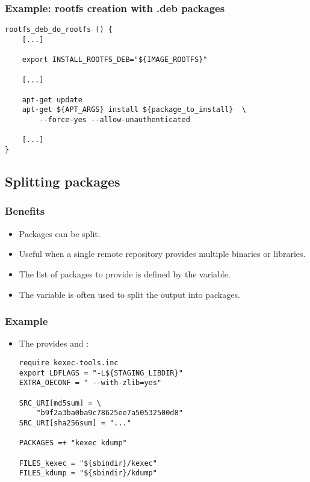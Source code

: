 \begin{frame}[fragile]
  \frametitle{Example: rootfs creation with .deb packages}
  \begin{block}{}
    \begin{verbatim}
rootfs_deb_do_rootfs () {
    [...]

    export INSTALL_ROOTFS_DEB="${IMAGE_ROOTFS}"

    [...]

    apt-get update
    apt-get ${APT_ARGS} install ${package_to_install}  \
        --force-yes --allow-unauthenticated

    [...]
}
    \end{verbatim}
  \end{block}
\end{frame}

\subsection{Splitting packages}

\begin{frame}
  \frametitle{Benefits}
  \begin{itemize}
    \item Packages can be split.
    \item Useful when a single remote repository provides multiple
      binaries or libraries.
    \item The list of packages to provide is defined by the
       variable.
    \item The  variable is often used to split the output
      into packages.
  \end{itemize}
\end{frame}

\begin{frame}[fragile]
  \frametitle{Example}
  \begin{itemize}
    \item The  provides  and :
    \begin{block}{}
    \begin{verbatim}
require kexec-tools.inc
export LDFLAGS = "-L${STAGING_LIBDIR}"
EXTRA_OECONF = " --with-zlib=yes"

SRC_URI[md5sum] = \
    "b9f2a3ba0ba9c78625ee7a50532500d8"
SRC_URI[sha256sum] = "..."

PACKAGES =+ "kexec kdump"

FILES_kexec = "${sbindir}/kexec"
FILES_kdump = "${sbindir}/kdump"
    \end{verbatim}
    \end{block}
  \end{itemize}
\end{frame}

